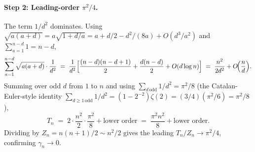 \documentclass[11pt,a4paper]{article}
\theoremstyle{plain}
\theoremstyle{definition}
\begin{document}
\paragraph{Step 2: Leading-order $\pi^2/4$.}
The term $1/d^2$ dominates. Using
$\sqrt{a(a+d)} = a\sqrt{1+d/a} = a + d/2 - d^2/(8a) + O(d^3/a^2)$ and
$\sum_{a=1}^{n-d} 1 = n - d$,
\begin{equation*}
   \sum_{a=1}^{n-d} \sqrt{a(a+d)} \cdot \frac{1}{d^2}
   \;=\; \frac{1}{d^2}\Bigl[\frac{(n-d)(n-d+1)}{2} + \frac{d(n-d)}{2}
   + O(d \log n)\Bigr]
   \;=\; \frac{n^2}{2 d^2} + O\!\Bigl(\frac{n}{d}\Bigr).
\end{equation*}
Summing over odd $d$ from $1$ to $n$ and using
$\sum_{d\,\mathrm{odd}} 1/d^2 = \pi^2 / 8$
(the Catalan-Euler-style identity $\sum_{d\ge 1\,\mathrm{odd}} 1/d^2
= (1 - 2^{-2})\zeta(2) = (3/4)(\pi^2/6) = \pi^2/8$),
\begin{equation*}
   T_n \;=\; 2 \cdot \frac{n^2}{2}\cdot \frac{\pi^2}{8} +
   \text{lower order} \;=\; \frac{\pi^2 n^2}{8} + \text{lower order}.
\end{equation*}
Dividing by $Z_n = n(n+1)/2 \sim n^2/2$ gives the leading
$T_n/Z_n \to \pi^2/4$, confirming $\gamma_n \to 0$.
\end{document}
